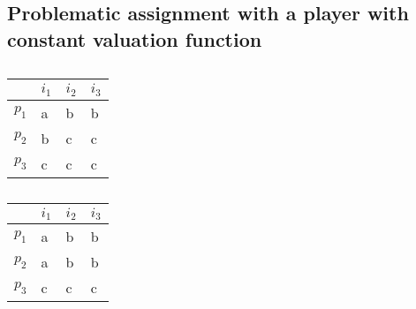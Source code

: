 \documentclass{article}
\begin{document}
\subsection{Problematic assignment with a player with constant valuation function}

\begin{table}[!htb]
    \begin{minipage}{.5\linewidth}
      \centering
        \begin{tabular}{|l|l|l|l|}
            \hline
                  & $i_1$ & $i_2$ & $i_3$ \\ \hline
            $p_1$ & a     & b     & b     \\ \hline
            $p_2$ & b     & c     & c     \\ \hline
            $p_3$ & c     & c     & c     \\ \hline
            
        \end{tabular}
        \caption{}
        \label{table:3-players-abb-bcc-ccc}
    \end{minipage}%
    \begin{minipage}{.5\linewidth}
      \centering
        \begin{tabular}{|l|l|l|l|}
            \hline
                  & $i_1$ & $i_2$ & $i_3$ \\ \hline
            $p_1$ & a     & b     & b     \\ \hline
            $p_2$ & a     & b     & b     \\ \hline
            $p_3$ & c     & c     & c     \\ \hline
        \end{tabular}
        \caption{}
    \end{minipage} 
\end{table}
\end{document}
